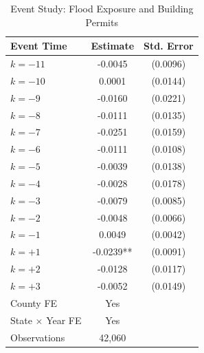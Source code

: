 \begin{table}[htbp]
\centering
\caption{Event Study: Flood Exposure and Building Permits}
\label{tab:event_study}
\begin{tabular}{lcc}
\hline\hline
Event Time & Estimate & Std. Error \\
\hline
$k = -11$ & -0.0045 & (0.0096) \\
$k = -10$ & 0.0001 & (0.0144) \\
$k = -9$ & -0.0160 & (0.0221) \\
$k = -8$ & -0.0111 & (0.0135) \\
$k = -7$ & -0.0251 & (0.0159) \\
$k = -6$ & -0.0111 & (0.0108) \\
$k = -5$ & -0.0039 & (0.0138) \\
$k = -4$ & -0.0028 & (0.0178) \\
$k = -3$ & -0.0079 & (0.0085) \\
$k = -2$ & -0.0048 & (0.0066) \\
$k = -1$ & 0.0049 & (0.0042) \\
$k = +1$ & -0.0239** & (0.0091) \\
$k = +2$ & -0.0128 & (0.0117) \\
$k = +3$ & -0.0052 & (0.0149) \\
\hline
County FE & Yes \\
State $\times$ Year FE & Yes \\
Observations & 42,060 \\
\hline\hline
\end{tabular}
\par{}
\end{table}

